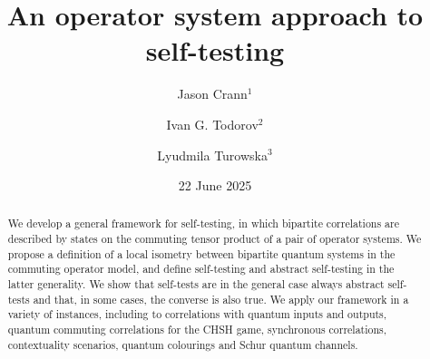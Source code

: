 \documentclass[11pt]{amsart}
\theoremstyle{definition}
\begin{document}
\title
{An operator system approach to self-testing}




\author[J. Crann]{Jason Crann$^{1}$}
\address{$^1$School of Mathematics \& Statistics, Carleton University, Ottawa, ON, Canada H1S 5B6}


\author[I. G. Todorov]{Ivan G. Todorov$^{2}$}
\address{$^{2}$School of Mathematical Sciences, University of Delaware, 501 Ewing Hall, Newark, DE 19716, USA}

\author[L. Turowska]{Lyudmila Turowska$^{3}$}
\address{$^{3}$Department of Mathematical Sciences, Chalmers University of Technology and the University of Gothenburg, Gothenburg SE-412 96, Sweden}

\begin{abstract} 
We develop a general framework for self-testing, in which bipartite 
correlations are described by states on the commuting tensor product
of a pair of operator systems. We propose a definition of a local isometry 
between bipartite quantum systems in the commuting operator model, and 
define self-testing and abstract self-testing in the latter generality. 
We show that self-tests are in the general case 
always abstract self-tests and that, in 
some cases, the converse is also true. 
We apply our framework in a variety of 
instances, including to correlations with quantum inputs and outputs, 
quantum commuting correlations for the CHSH game, synchronous correlations, 
contextuality scenarios, quantum colourings
and Schur quantum channels. 
\end{abstract}


\date{22 June 2025}

\maketitle

\tableofcontents





\end{document}
